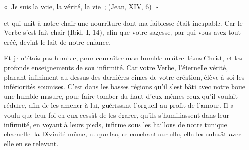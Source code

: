 \documentclass[french,twoside]{book} %
\newenvironment{quoteblock}%
  {\begin{quoting}}
  {\end{quoting}}
\newenvironment{quotebar}{%
    \def\FrameCommand{{\color{rubric!10!}\vrule width 0.5em} \hspace{0.9em}}%
    \def\OuterFrameSep{\itemsep} %
    \MakeFramed {\advance\hsize-\width \FrameRestore}
  }%
  {%
    \endMakeFramed
  }
\renewenvironment{quoteblock}%
  {%
    \savenotes
    \setstretch{0.9}
    \normalfont
    \begin{quotebar}
  }
  {%
    \end{quotebar}
    \spewnotes
  }
\begin{document}
\begin{quoteblock}
\noindent « Je suis la voie, la vérité, la vie ; (Jean, XIV, 6) »\end{quoteblock}

\noindent et qui unit à notre chair une nourriture dont ma faiblesse était incapable. Car le Verbe s’est fait chair (Ibid. I, 14), afin que votre sagesse, par qui vous avez tout créé, devînt le lait de notre enfance.\par
Et je n’étais pas humble, pour connaître mon humble maître Jésus-Christ, et les profonds enseignements de son infirmité. Car votre Verbe, l’éternelle vérité, planant infiniment au-dessus des dernières cimes de votre création, élève à soi les infériorités soumises. C’est dans les basses régions qu’il s’est bâti avec notre boue une humble masure, pour faire tomber du haut d’eux-mêmes ceux qu’il voulait réduire, afin de les amener à lui, guérissant l’orgueil au profit de l’amour. Il a voulu que leur foi en eux cessât de les égarer, qu’ils s’humiliassent dans leur infirmité, en voyant à leurs pieds, infirme sous les haillons de notre tunique charnelle, la Divinité même, et que las, se couchant sur elle, elle les enlevât avec elle en se relevant.
\end{document}
